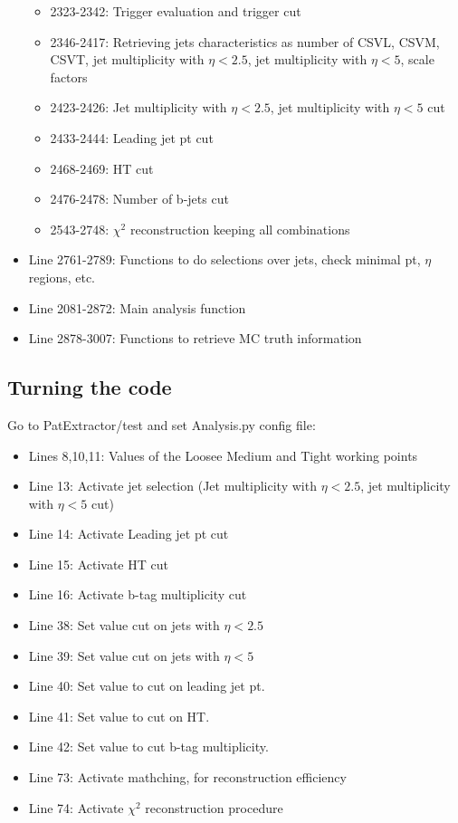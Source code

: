 \documentclass[11pt,a4paper]{article}
\begin{document}
\begin{itemize}
  \begin{itemize}
  \item 2323-2342: Trigger evaluation and trigger cut
  \item 2346-2417: Retrieving jets characteristics as number of CSVL, CSVM, CSVT, jet multiplicity with $\eta<2.5$, jet multiplicity with $\eta<5$, scale factors
  \item 2423-2426: Jet multiplicity with $\eta<2.5$, jet multiplicity with $\eta<5$ cut
  \item 2433-2444: Leading jet pt cut
  \item 2468-2469: HT cut
  \item 2476-2478: Number of b-jets cut
  \item 2543-2748: $\chi^{2}$ reconstruction keeping all combinations
  \end{itemize}
\item Line 2761-2789: Functions to do selections over jets, check minimal pt, $\eta$ regions, etc.
\item Line 2081-2872: Main analysis function
\item Line 2878-3007: Functions to retrieve MC truth information
\end{itemize}

\subsection{Turning the code}

Go to PatExtractor/test and set Analysis.py config file:
\begin{itemize}
\item Lines 8,10,11: Values of the Loosee Medium and Tight working points
\item Line 13: Activate jet selection (Jet multiplicity with $\eta<2.5$, jet multiplicity with $\eta<5$ cut)
\item Line 14: Activate Leading jet pt cut
\item Line 15: Activate HT cut
\item Line 16: Activate b-tag multiplicity cut
\item Line 38: Set value cut on jets with $\eta<2.5$
\item Line 39: Set value cut on jets with $\eta<5$
\item Line 40: Set value to cut on leading jet pt.
\item Line 41: Set value to cut on HT.
\item Line 42: Set value to cut b-tag multiplicity.
\item Line 73: Activate mathching, for reconstruction efficiency
\item Line 74: Activate $\chi^{2}$ reconstruction procedure
\end{itemize}
\end{document}
